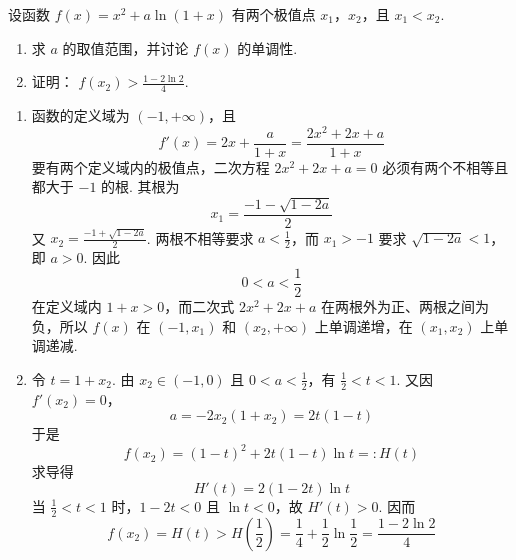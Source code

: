 \begin{problem}
设函数 \( f(x) = x^{2} + a\ln (1 + x) \) 有两个极值点 \(x_{1}\)，\(x_{2}\)，且 \( x_{1} < x_{2} \).

\begin{enumerate}
\item 求 \(a\) 的取值范围，并讨论 \(f(x)\) 的单调性.
\item 证明： \(f(x_{2}) > \frac{1 - 2\ln 2}{4}\).
\end{enumerate}

\begin{solution}
\begin{enumerate}
\item 函数的定义域为 \((-1,+\infty)\)，且
\[
f'(x)=2x+\frac{a}{1+x}=\frac{2x^{2}+2x+a}{1+x}
\]
要有两个定义域内的极值点，二次方程 \(2x^{2}+2x+a=0\) 必须有两个不相等且都大于 \(-1\) 的根. 其根为
\[
x_{1}=\frac{-1-\sqrt{1-2a}}{2}
\]
又 \(x_{2}=\frac{-1+\sqrt{1-2a}}{2}\).
两根不相等要求 \(a<\frac12\)，而 \(x_{1}>-1\) 要求 \(\sqrt{1-2a}<1\)，即 \(a>0\). 因此
\[
0<a<\frac12
\]
在定义域内 \(1+x>0\)，而二次式 \(2x^{2}+2x+a\) 在两根外为正、两根之间为负，所以 \(f(x)\) 在 \((-1,x_{1})\) 和 \((x_{2},+\infty)\) 上单调递增，在 \((x_{1},x_{2})\) 上单调递减.
\item 令 \(t=1+x_{2}\). 由 \(x_{2}\in(-1,0)\) 且 \(0<a<\frac12\)，有 \(\frac12<t<1\). 又因 \(f'(x_{2})=0\)，
\[
a=-2x_{2}(1+x_{2})=2t(1-t)
\]
于是
\[
f(x_{2})=(1-t)^{2}+2t(1-t)\ln t=:H(t)
\]
求导得
\[
H'(t)=2(1-2t)\ln t
\]
当 \(\frac12<t<1\) 时，\(1-2t<0\) 且 \(\ln t<0\)，故 \(H'(t)>0\). 因而
\[
f(x_{2})=H(t)>H\left(\frac12\right)=\frac14+\frac12\ln\frac12=\frac{1-2\ln2}{4}
\]
\end{enumerate}
\end{solution}
\end{problem}
